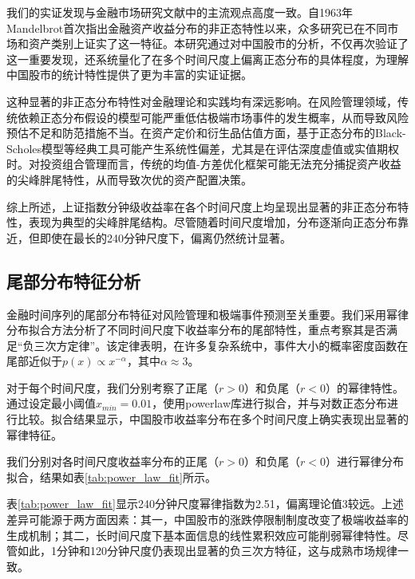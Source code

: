 \documentclass[12pt, a4paper]{article}
\begin{document}
我们的实证发现与金融市场研究文献中的主流观点高度一致。自1963年Mandelbrot首次指出金融资产收益分布的非正态特性以来，众多研究已在不同市场和资产类别上证实了这一特征。本研究通过对中国股市的分析，不仅再次验证了这一重要发现，还系统量化了在多个时间尺度上偏离正态分布的具体程度，为理解中国股市的统计特性提供了更为丰富的实证证据。

这种显著的非正态分布特性对金融理论和实践均有深远影响。在风险管理领域，传统依赖正态分布假设的模型可能严重低估极端市场事件的发生概率，从而导致风险预估不足和防范措施不当。在资产定价和衍生品估值方面，基于正态分布的Black-Scholes模型等经典工具可能产生系统性偏差，尤其是在评估深度虚值或实值期权时。对投资组合管理而言，传统的均值-方差优化框架可能无法充分捕捉资产收益的尖峰胖尾特性，从而导致次优的资产配置决策。

综上所述，上证指数分钟级收益率在各个时间尺度上均呈现出显著的非正态分布特性，表现为典型的尖峰胖尾结构。尽管随着时间尺度增加，分布逐渐向正态分布靠近，但即使在最长的240分钟尺度下，偏离仍然统计显著。

\subsection{尾部分布特征分析}

金融时间序列的尾部分布特征对风险管理和极端事件预测至关重要。我们采用幂律分布拟合方法分析了不同时间尺度下收益率分布的尾部特性，重点考察其是否满足“负三次方定律”。该定律表明，在许多复杂系统中，事件大小的概率密度函数在尾部近似于$p(x) \propto x^{-\alpha}$，其中$\alpha \approx 3$。

对于每个时间尺度，我们分别考察了正尾（$r > 0$）和负尾（$r < 0$）的幂律特性。通过设定最小阈值$x_{min} = 0.01$，使用powerlaw库进行拟合，并与对数正态分布进行比较。拟合结果显示，中国股市收益率分布在多个时间尺度上确实表现出显著的幂律特征。

我们分别对各时间尺度收益率分布的正尾（$r>0$）和负尾（$r<0$）进行幂律分布拟合，结果如表\ref{tab:power_law_fit}所示。

表\ref{tab:power_law_fit}显示240分钟尺度幂律指数为2.51，偏离理论值3较远。上述差异可能源于两方面因素：其一，中国股市的涨跌停限制制度改变了极端收益率的生成机制；其二，长时间尺度下基本面信息的线性累积效应可能削弱幂律特性。尽管如此，1分钟和120分钟尺度仍表现出显著的负三次方特征，这与成熟市场规律一致。
\end{document}
